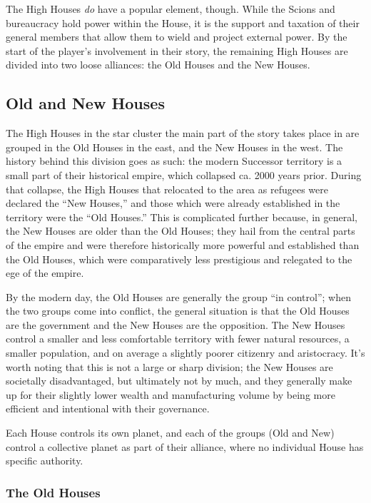 \documentclass[11pt]{report}
\begin{document}
    The High Houses \emph{do} have a popular element, though. While the Scions and bureaucracy hold power within the House, it is the support and taxation of their general members that allow them to wield and project external power. By the start of the player's involvement in their story, the remaining High Houses are divided into two loose alliances: the Old Houses and the New Houses.
    
    \subsection{Old and New Houses}
    The High Houses in the star cluster the main part of the story takes place in are grouped in the Old Houses in the east, and the New Houses in the west. The history behind this division goes as such: the modern Successor territory is a small part of their historical empire, which collapsed ca. 2000 years prior. During that collapse, the High Houses that relocated to the area as refugees were declared the ``New Houses,'' and those which were already established in the territory were the ``Old Houses.'' This is complicated further because, in general, the New Houses are older than the Old Houses; they hail from the central parts of the empire and were therefore historically more powerful and established than the Old Houses, which were comparatively less prestigious and relegated to the ege of the empire.

    By the modern day, the Old Houses are generally the group ``in control''; when the two groups come into conflict, the general situation is that the Old Houses are the government and the New Houses are the opposition. The New Houses control a smaller and less comfortable territory with fewer natural resources, a smaller population, and on average a slightly poorer citizenry and aristocracy. It's worth noting that this is not a large or sharp division; the New Houses are societally disadvantaged, but ultimately not by much, and they generally make up for their slightly lower wealth and manufacturing volume by being more efficient and intentional with their governance.

    Each House controls its own planet, and each of the groups (Old and New) control a collective planet as part of their alliance, where no individual House has specific authority.


    \subsubsection{The Old Houses}
\end{document}
